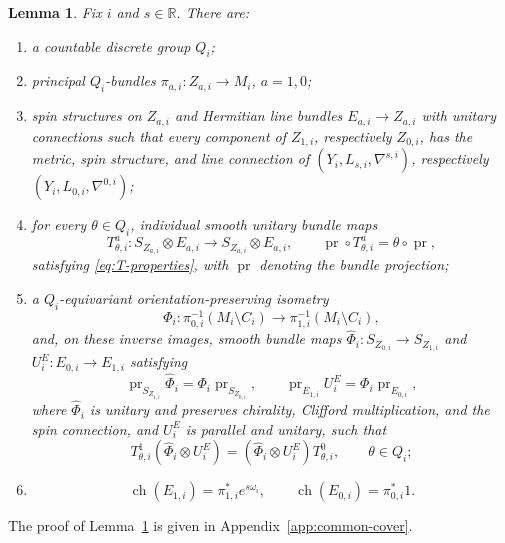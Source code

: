 \documentclass[12pt,reqno]{amsart}
\numberwithin{equation}{section}
\newtheorem{lemma}[theorem]{Lemma}
\theoremstyle{definition}
\newcommand{\ch}{\operatorname{ch}}
\begin{document}
\begin{lemma}\label{lem:H-coverings}
Fix $i$ and $s\in\mathbb R$.  There are:
\begin{enumerate}[label=\textup{(H\arabic*)},ref=\textup{(H\arabic*)},
                  start=12,leftmargin=3.4em]
\item\label{H:group}
a countable discrete group $Q_i$;

\item\label{H:covers}
principal $Q_i$-bundles $\pi_{a,i}:Z_{a,i}\to M_i$, $a=1,0$;

\item\label{H:local}
spin structures on $Z_{a,i}$ and Hermitian line bundles
$E_{a,i}\to Z_{a,i}$ with unitary connections such that every
component of $Z_{1,i}$, respectively $Z_{0,i}$, has the metric, spin
structure, and line connection of
$(Y_i,L_{s,i},\nabla^{s,i})$, respectively
$(Y_i,L_{0,i},\nabla^{0,i})$;

\item\label{H:Q-maps}
for every $\theta\in Q_i$, individual smooth unitary bundle maps
\[
 T^a_{\theta,i}:S_{Z_{a,i}}\otimes E_{a,i}
 \longrightarrow S_{Z_{a,i}}\otimes E_{a,i},
 \qquad
 \operatorname{pr}\circ T^a_{\theta,i}=\theta\circ\operatorname{pr},
\]
satisfying \eqref{eq:T-properties}, with $\operatorname{pr}$ denoting
the bundle projection;

\item\label{H:outside-maps}
a $Q_i$-equivariant orientation-preserving isometry
\[
 \Phi_i:\pi_{0,i}^{-1}(M_i\setminus C_i)
 \longrightarrow\pi_{1,i}^{-1}(M_i\setminus C_i),
\]
and, on these inverse images, smooth bundle maps
$\widehat\Phi_i:S_{Z_{0,i}}\to S_{Z_{1,i}}$ and
$U_i^E:E_{0,i}\to E_{1,i}$ satisfying
\[
 \operatorname{pr}_{S_{Z_{1,i}}}\widehat\Phi_i
 =\Phi_i\operatorname{pr}_{S_{Z_{0,i}}},
 \qquad
 \operatorname{pr}_{E_{1,i}}U_i^E
 =\Phi_i\operatorname{pr}_{E_{0,i}},
\]
where $\widehat\Phi_i$ is unitary and preserves chirality, Clifford
multiplication, and the spin connection, and $U_i^E$
is parallel and unitary, such that
\begin{equation}\label{eq:H-Q-equality}
 T^1_{\theta,i}(\widehat\Phi_i\otimes U_i^E)
 =(\widehat\Phi_i\otimes U_i^E)T^0_{\theta,i},
 \qquad \theta\in Q_i;
\end{equation}

\item\label{H:forms-on-base}
\[
 \ch(E_{1,i})=\pi_{1,i}^*e^{s\omega_i},
 \qquad
 \ch(E_{0,i})=\pi_{0,i}^*1.
\]
\end{enumerate}
\end{lemma}
The proof of Lemma~\ref{lem:H-coverings} is given in Appendix~\ref{app:common-cover}.
\end{document}
